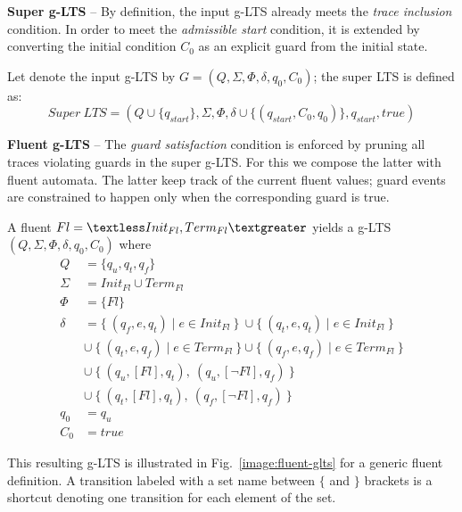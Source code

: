 \noindent \textbf{Super g-LTS} -- By definition, the input g-LTS already meets the \emph{trace inclusion} condition. In order to meet the \emph{admissible start} condition, it is extended by converting the initial condition $C_0$ as an explicit guard from the initial state. 

Let denote the input g-LTS by $G = (Q,\Sigma,\Phi,\delta,q_{0},C_{0})$; the super LTS is defined as:
\begin{equation*}
Super~LTS = (Q \cup \{ q_{start} \}, \Sigma, \Phi, \delta \cup \{(q_{start},C_0,q_0)\},q_{start},true)
\end{equation*}

\noindent \textbf{Fluent g-LTS} -- The \emph{guard satisfaction} condition is enforced by pruning all traces violating guards in the super g-LTS. For this we compose the latter with fluent automata. The latter keep track of the current fluent values; guard events are constrained to happen only when the corresponding guard is true.

A fluent $Fl = \textless Init_{Fl}, Term_{Fl} \textgreater $ yields a g-LTS $(Q,\Sigma,\Phi,\delta,q_{0},C_{0})$ where
\begin{align*}
Q      &= \{q_u,q_t,q_f\}            \\
\Sigma &= Init_{Fl} \cup Term_{Fl}   \\
\Phi   &= \{ Fl \} \\
\delta &=    \{~(q_f,e,q_t) \mid e \in Init_{Fl}~\}~\cup \{~(q_t,e,q_t) \mid e \in Init_{Fl}~\} \\
       &\cup~\{~(q_t,e,q_f) \mid e \in Term_{Fl}~\} \cup \{~(q_f,e,q_f) \mid e \in Term_{Fl}~\} \\
       &\cup~\{~(q_u, [Fl], q_t),~(q_u, [\neg Fl], q_f)~\} \\
       &\cup~\{~(q_t, [Fl], q_t),~(q_f, [\neg Fl], q_f)~\} \\
q_0    &= q_u \\
C_0    &= true
\end{align*}

This resulting g-LTS is illustrated in Fig.~\ref{image:fluent-glts} for a generic fluent definition. A transition labeled with a set name between $\{$ and $\}$ brackets is a shortcut denoting one transition for each element of the set.


